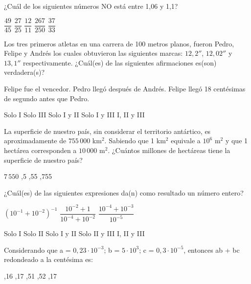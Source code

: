 \documentclass[pagina vacia]{srs}
\begin{document}
\begin{preguntas}[after-item-skip=1cm]
\pregunta ¿Cuál de los siguientes números NO está entre 1,06 y 1,1?
\begin{vertical}
\alternativa \( \dfrac{49}{45} \)
\alternativa \( \dfrac{27}{25} \)
\alternativa \( \dfrac{12}{11} \)
\alternativa \( \dfrac{267}{250} \)
\alternativa \( \dfrac{37}{33} \)
\end{vertical}

\pregunta Los tres primeros atletas en una carrera de 100 metros planos, fueron Pedro, Felipe y Andrés los cuales obtuvieron las siguientes marcas: \(12,2''\), \(12,02''\) y \(13,1''\) respectivamente. ¿Cuál(es) de las siguientes afirmaciones es(son) verdadera(s)?
\begin{verticali}
\alternativa Felipe fue el vencedor.
\alternativa Pedro llegó después de Andrés.
\alternativa Felipe llegó 18 centésimas de segundo antes que Pedro.
\end{verticali}
\begin{vertical}
\alternativa Solo I
\alternativa Solo III
\alternativa Solo I y II
\alternativa Solo I y III
\alternativa I, II y III
\end{vertical}

\pregunta La superficie de nuestro país, sin considerar el territorio antártico, es aproximadamente de \(755\,000\) km\(^2\). Sabiendo que 1 km\(^2\) equivale a \(10^6\) m\(^2\) y que 1 hectárea corresponden a \(10\,000\) m\(^2\). ¿Cuántos millones de hectáreas tiene la superficie de nuestro país?
\begin{vertical}
\alternativa \(7\,550\)
,5
,55
,755
\end{vertical}

\pregunta ¿Cuál(es) de las siguientes expresiones da(n) como resultado un número entero?
\begin{verticali}
\alternativa \( \left(10^{-1} + 10^{-2}\right)^{-1} \)
\alternativa \( \dfrac{10^{-2} + 1}{10^{-4} + 10^{-2}} \)
\alternativa \( \dfrac{10^{-4} + 10^{-3}}{10^{-5}} \)
\end{verticali}
\begin{vertical}
\alternativa Solo I
\alternativa Solo II
\alternativa Solo I y II
\alternativa Solo II y III
\alternativa I, II y III
\end{vertical}

\pregunta Considerando que a = \(0,23 \cdot 10^{-3}\); b = \(5 \cdot 10^3\); c = \(0,3 \cdot 10^{-5}\), entonces ab + bc redondeado a la centésima es:
\begin{vertical}
,16
,17
,51
,52
,17
\end{vertical}


\end{preguntas}
\end{document}
